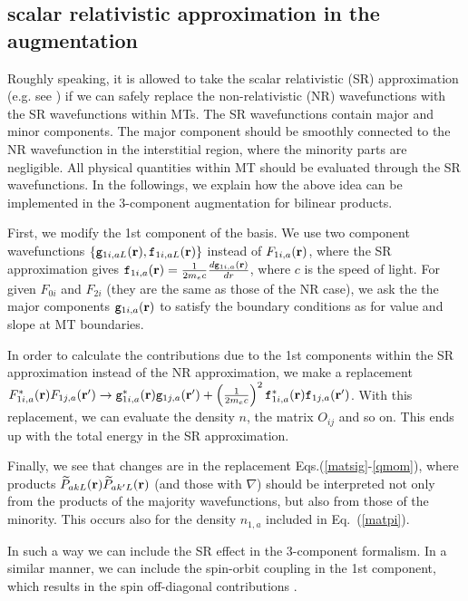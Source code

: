 \documentclass[a4paper,10pt,aip,onecolumn,amsmath,amssymb,floatfix,rmp]{revtex4-1}
\newcommand{\bfr}{{\bf r}}
\newcommand{\req}[1]{\mbox{Eq.~\!(\ref{#1})}}
\begin{document}
\subsection{scalar relativistic approximation in the augmentation}
\label{app:srel}
Roughly speaking, it is allowed to take the scalar relativistic
(SR) approximation (e.g. see \cite{rmartinbook}) if we can safely replace the
non-relativistic (NR) wavefunctions with the SR wavefunctions within MTs.
The SR wavefunctions contain major and minor components. 
The major component should be smoothly connected to the NR wavefunction in 
the interstitial region, where the minority parts are negligible. 
All physical quantities within MT should be evaluated 
through the SR wavefunctions.
In the followings, we explain how the above idea can be implemented in the
3-component augmentation for bilinear products. 

First, we modify the 1st component of the basis. 
We use two component wavefunctions $\{{\mathtt g}_{1i,aL}(\bfr),{\mathtt f}_{1i,aL}(\bfr)\}$
instead of $F_{1i,a}(\bfr)$, where the SR approximation gives
${\mathtt f}_{1i,a}(\bfr)=\frac{1}{2m_e c} \frac{d {\mathtt g}_{1i,a}(\bfr)}{dr}$, 
where $c$ is the speed of light. 
For given $F_{0i}$ and $F_{2i}$ (they are the same as those of the NR case),
we ask the the major components ${\mathtt g}_{1i,a}(\bfr)$
to satisfy the boundary conditions as for value and slope at MT boundaries.

In order to calculate the contributions due to the 1st components within the SR approximation
instead of the NR approximation, we make a replacement 
$F^*_{1i,a}(\bfr)F_{1j,a}(\bfr') \rightarrow 
 {\mathtt g}^*_{1i,a}(\bfr){\mathtt g}_{1j,a}(\bfr')
+\left(\frac{1}{2m_e c}\right)^2 
 {\mathtt f}^*_{1i,a}(\bfr){\mathtt f}_{1j,a}(\bfr')$.
With this replacement, we can evaluate the density $n$, the matrix $O_{ij}$ 
and so on. This ends up with the total energy in the SR approximation.

Finally, we see that changes are in the replacement Eqs.(\ref{matsig}-\ref{qmom}),
where products $\widetilde{P}_{akL}(\bfr) \widetilde{P}_{ak'L}(\bfr)$ 
(and those with $\nabla$) should be interpreted not only from the products 
of the majority wavefunctions, but also from those of the minority.
This occurs also for the density $n_{1,a}$ included in \req{matpi}.

In such a way we can include the SR effect in the 3-component formalism.
In a similar manner, we can include the spin-orbit coupling in the 1st component, 
which results in the spin off-diagonal contributions \cite{chantis06a}.
\end{document}
